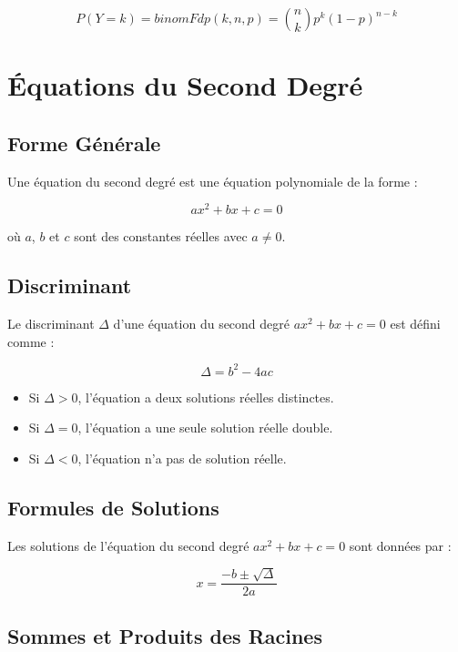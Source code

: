 \documentclass{report}
\begin{document}
    \[P(Y=k) = binomFdp(k, n, p) = \binom{n}{k} p^k (1-p)^{n-k}\]

    \newpage


    \section{Équations du Second Degré}

    \subsection{Forme Générale}

    Une équation du second degré est une équation polynomiale de la forme :

    \[ ax^2 + bx + c = 0 \]

    où \( a \), \( b \) et \( c \) sont des constantes réelles avec \( a \neq 0 \).

    \subsection{Discriminant}

    Le discriminant \( \Delta \) d'une équation du second degré \( ax^2 + bx + c = 0 \) est défini comme :

    \[ \Delta = b^2 - 4ac \]

    \begin{itemize}
        \item Si \( \Delta > 0 \), l'équation a deux solutions réelles distinctes.
        \item Si \( \Delta = 0 \), l'équation a une seule solution réelle double.
        \item Si \( \Delta < 0 \), l'équation n'a pas de solution réelle.
    \end{itemize}

    \subsection{Formules de Solutions}

    Les solutions de l'équation du second degré \( ax^2 + bx + c = 0 \) sont données par :

    \[ x = \frac{-b \pm \sqrt{\Delta}}{2a} \]

    \subsection{Sommes et Produits des Racines}
\end{document}
